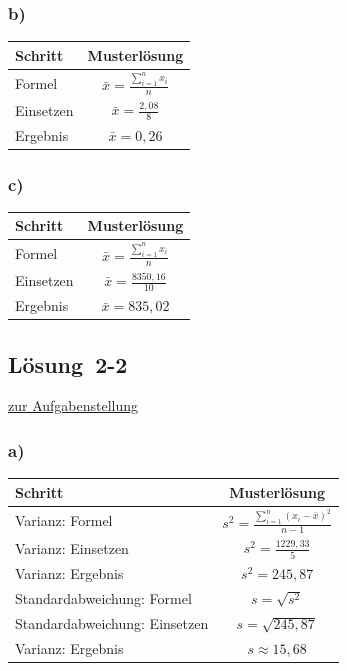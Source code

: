 \documentclass[
  11pt,
  ngerman,
  a4paper,
]{report}
\begin{document}
\hypertarget{b-2}{%
\subsubsection{b)}\label{b-2}}

\begin{table}[H]
\centering
\begin{tabular}{lc}
\toprule
Schritt & Musterlösung\\
\midrule
Formel & $\bar{x}=\frac{\sum\limits_{i=1}^{n}x_{i}}{n}$\\
Einsetzen & $\bar{x}=\frac{2{,}08}{8}$\\
Ergebnis & $\bar{x}=0{,}26$\\
\bottomrule
\end{tabular}
\end{table}

\hypertarget{c-2}{%
\subsubsection{c)}\label{c-2}}

\begin{table}[H]
\centering
\begin{tabular}{lc}
\toprule
Schritt & Musterlösung\\
\midrule
Formel & $\bar{x}=\frac{\sum\limits_{i=1}^{n}x_{i}}{n}$\\
Einsetzen & $\bar{x}=\frac{8350{,}16}{10}$\\
Ergebnis & $\bar{x}=835{,}02$\\
\bottomrule
\end{tabular}
\end{table}

\hypertarget{loesung-2-2}{%
\subsection{Lösung~2-2}\label{loesung-2-2}}

\protect\hyperlink{aufgabe-2-2}{zur Aufgabenstellung}

\hypertarget{a-3}{%
\subsubsection{a)}\label{a-3}}

\begin{table}[H]
\centering
\begin{tabular}{lc}
\toprule
Schritt & Musterlösung\\
\midrule
Varianz: Formel & $s^2=\frac{\sum\limits_{i=1}^{n}(x_{i}-\bar{x})^2}{n-1}$\\
Varianz: Einsetzen & $s^2=\frac{1229{,}33}{5}$\\
Varianz: Ergebnis & $s^2=245{,}87$\\
Standardabweichung: Formel & $s=\sqrt{s^2}$\\
Standardabweichung: Einsetzen & $s=\sqrt{245{,}87}$\\
Varianz: Ergebnis & $s\approx15{,}68$\\
\bottomrule
\end{tabular}
\end{table}
\end{document}
